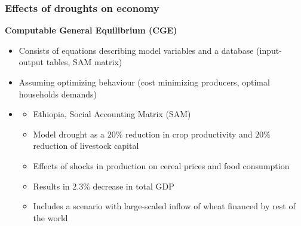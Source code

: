 \documentclass{beamer}              %
\begin{document}
\begin{frame}

\frametitle{Effects of droughts on economy}\label{Effects} 
\begin{block}{\textbf{Computable General Equilibrium (CGE)}}

\begin{itemize}

\item Consists of equations describing model variables and a database (input-output tables, SAM matrix)
\item Assuming optimizing behaviour (cost minimizing producers, optimal households demands)

\vspace{0.3cm}

\item \underline{\textbf{\cite{robinson2010}}}
\begin{itemize}
\item Ethiopia, Social Accounting Matrix (SAM)

\item Model drought as a $20\%$ reduction in crop productivity and $20\%$ reduction of livestock capital
\item Effects of shocks in production on cereal prices and food consumption
\item Results in $2.3\%$ decrease in total GDP
\item Includes a scenario with large-scaled inflow of wheat financed by rest of the world
\end{itemize}
\end{itemize}
\end{block}
\end{frame}


\end{document}
